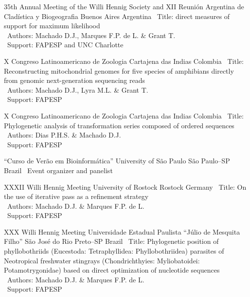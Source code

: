 \vspace{.5em}

\cventry{---}
	{35th Annual Meeting of the Willi Hennig Society and XII Reunión Argentina de Cladística y Biogeografia}
	{Buenos Aires}
	{Argentina}
	{}
	{
		\textbullet~Title: direct measures of support for maximum likelihood\\
		\textbullet~Authors: Machado D.J., Marques F.P. de L. \& Grant T.\\
		\textbullet~Support: FAPESP and UNC Charlotte
	}

\vspace{.5em}

	{X Congreso Latinoamericano de Zoologia}
	{Cartajena das Indias}
	{Colombia}
	{}
	{
		\textbullet~Title: Reconstructing mitochondrial genomes for five species of amphibians directly from genomic next-generation sequencing reads\\
		\textbullet~Authors: Machado D.J., Lyra M.L. \& Grant T.\\
		\textbullet~Support: FAPESP
	}

\vspace{.5em}

\cventry{---}
	{X Congreso Latinoamericano de Zoologia}
	{Cartajena das Indias}
	{Colombia}
	{}
	{
		\textbullet~Title: Phylogenetic analysis of transformation series composed of ordered sequences\\
		\textbullet~Authors: Dias P.H.S. \& Machado D.J.\\
		\textbullet~Support: FAPESP
	}

\vspace{.5em}

\cventry{---}
	{``Curso de Verão em Bioinformática''}
	{University of São Paulo}
	{São Paulo--SP}
	{Brazil}
	{
		\textbullet~Event organizer and panelist
	}

\vspace{.5em}

	{XXXII Willi Hennig Meeting}
	{University of Rostock}
	{Rostock}
	{Germany}
	{
		\textbullet~Title: On the use of iterative pass as a refinement strategy\\
		\textbullet~Authors: Machado D.J. \& Marques F.P. de L.\\
		\textbullet~Support: FAPESP
	}

\vspace{.5em}

	{XXX Willi Hennig Meeting}
	{Universidade Estadual Paulista ``Júlio de Mesquita Filho''}
	{São José do Rio Preto--SP}
	{Brazil}
	{
		\textbullet~Title: Phylogenetic position of phyllobothriids (Eucestoda: Tetraphyllidea: Phyllobothriidea) parasites of Neotropical freshwater stingrays (Chondrichthyies: Myliobatoidei: Potamotrygonidae) based on direct optimization of nucleotide sequences\\
		\textbullet~Authors: Machado D.J. \& Marques F.P. de L.\\
		\textbullet~Support: FAPESP
	}

